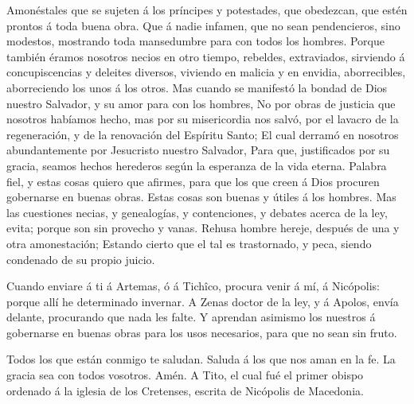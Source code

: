  Amonéstales que se sujeten á los príncipes y potestades,
que obedezcan, que estén prontos á toda buena obra.  Que á
nadie infamen, que no sean pendencieros, sino modestos, mostrando toda
mansedumbre para con todos los hombres.  Porque también
éramos nosotros necios en otro tiempo, rebeldes, extraviados, sirviendo
á concupiscencias y deleites diversos, viviendo en malicia y en envidia,
aborrecibles, aborreciendo los unos á los otros.  Mas cuando
se manifestó la bondad de Dios nuestro Salvador, y su amor para con los
hombres,  No por obras de justicia que nosotros habíamos
hecho, mas por su misericordia nos salvó, por el lavacro de la
regeneración, y de la renovación del Espíritu Santo;  El
cual derramó en nosotros abundantemente por Jesucristo nuestro Salvador,
 Para que, justificados por su gracia, seamos hechos
herederos según la esperanza de la vida eterna.  Palabra
fiel, y estas cosas quiero que afirmes, para que los que creen á Dios
procuren gobernarse en buenas obras. Estas cosas son buenas y útiles á
los hombres.  Mas las cuestiones necias, y genealogías, y
contenciones, y debates acerca de la ley, evita; porque son sin provecho
y vanas.  Rehusa hombre hereje, después de una y otra
amonestación;  Estando cierto que el tal es trastornado, y
peca, siendo condenado de su propio juicio.

 Cuando enviare á ti á Artemas, ó á Tichîco, procura venir
á mí, á Nicópolis: porque allí he determinado invernar.  A
Zenas doctor de la ley, y á Apolos, envía delante, procurando que nada
les falte.  Y aprendan asimismo los nuestros á gobernarse
en buenas obras para los usos necesarios, para que no sean sin fruto.

 Todos los que están conmigo te saludan. Saluda á los que
nos aman en la fe. La gracia sea con todos vosotros. Amén. A Tito, el
cual fué el primer obispo ordenado á la iglesia de los Cretenses,
escrita de Nicópolis de Macedonia.
